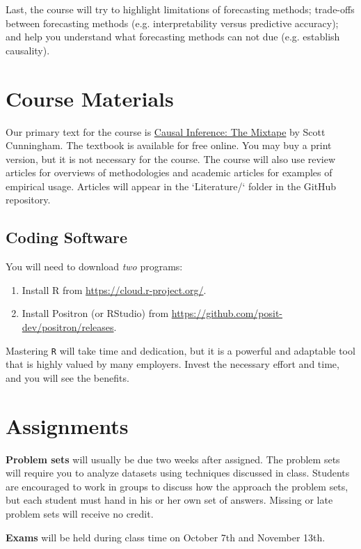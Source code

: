 \documentclass[12pt]{article}
\begin{document}
Last, the course will try to highlight limitations of forecasting methods; trade-offs between forecasting methods (e.g. interpretability versus predictive accuracy); and help you understand what forecasting methods can not due (e.g. establish causality). 


\section*{Course Materials}

Our primary text for the course is \href{https://mixtape.scunning.com/}{Causal Inference: The Mixtape} by Scott Cunningham. The textbook is available for free online. You may buy a print version, but it is not necessary for the course. The course will also use review articles for overviews of methodologies and academic articles for examples of empirical usage. Articles will appear in the `Literature/` folder in the GitHub repository.

\subsection*{Coding Software}

You will need to download \emph{two} programs:
\begin{enumerate}
  \item Install R from \url{https://cloud.r-project.org/}.
  \item Install Positron (or RStudio) from \url{https://github.com/posit-dev/positron/releases}. 
\end{enumerate}

\bigskip
Mastering \texttt{R} will take time and dedication, but it is a powerful and adaptable tool that is highly valued by many employers. Invest the necessary effort and time, and you will see the benefits.


\section*{Assignments}

\textbf{Problem sets} will usually be due two weeks after assigned. 
The problem sets will require you to analyze datasets using techniques discussed in class. 
Students are encouraged to work in groups to discuss how the approach the problem sets, but each student must hand in his or her own set of answers. 
Missing or late problem sets will receive no credit.

\textbf{Exams} will be held during class time on October 7th and November 13th.
\end{document}
